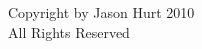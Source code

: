 \newpage
\vspace*{\fill}
\begin{center}
Copyright by Jason Hurt 2010\\
All Rights Reserved
\end{center}
\vspace*{\fill}
